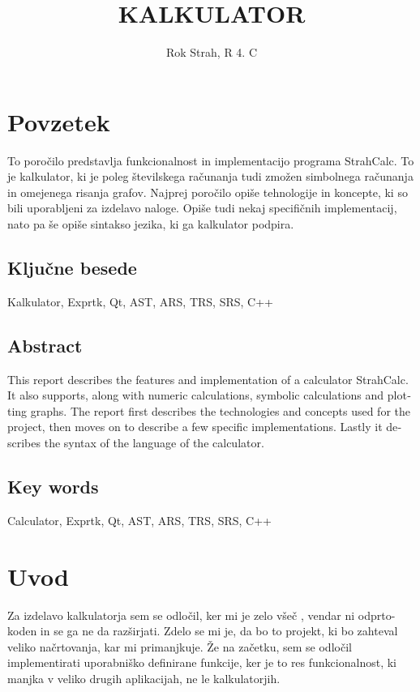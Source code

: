 \documentclass[12pt]{report}
\title{KALKULATOR}
\author{Rok Strah, R 4. C}
\begin{document}
\maketitle

\setcounter{page}{2}
\chapter*{Povzetek}
	To poročilo predstavlja funkcionalnost in implementacijo programa StrahCalc.
	To je kalkulator, ki je poleg številskega računanja tudi zmožen simbolnega računanja in omejenega risanja grafov.
	Najprej poročilo opiše tehnologije in koncepte, ki so bili uporabljeni za izdelavo naloge.
	Opiše tudi nekaj specifičnih implementacij, nato pa še opiše sintakso jezika, ki ga kalkulator podpira.
\section*{Ključne besede}
	Kalkulator, Exprtk, Qt, AST, ARS, TRS, SRS, C++
\begin{otherlanguage}{british}
\chapter*{Abstract}
	This report describes the features and implementation of a calculator StrahCalc. 
	It also supports, along with numeric calculations, symbolic calculations and plotting graphs.
	The report first describes the technologies and concepts used for the project, then moves on to describe a few specific implementations.
	Lastly it describes the syntax of the language of the calculator.
\section*{Key words}
	Calculator, Exprtk, Qt, AST, ARS, TRS, SRS, C++
\end{otherlanguage}
\thispagestyle{empty}


{\pagestyle{empty}
\clearpage
\tableofcontents
\clearpage
\listoffigures
\clearpage}

\chapter{Uvod}
\label{intro}
	Za izdelavo kalkulatorja sem se odločil, ker mi je zelo všeč , vendar ni odprto-koden in se ga ne da razširjati.
	Zdelo se mi je, da bo to projekt, ki bo zahteval veliko načrtovanja, kar mi primanjkuje.
	Že na začetku, sem se odločil implementirati uporabniško definirane funkcije, ker je to res funkcionalnost, ki manjka v veliko drugih aplikacijah, ne le kalkulatorjih.
\end{document}
